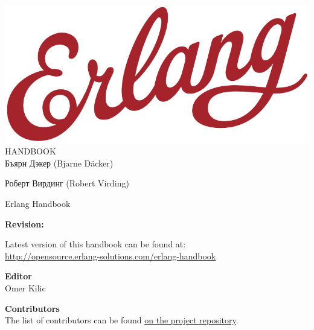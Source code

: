 \documentclass[oneside]{book}
\begin{document}
\begin{titlepage}
\centering

\vspace*{70pt}
\includegraphics[scale=0.3]{includes/erlang-logo.png}\\[0.8\baselineskip]
{\Huge \sffamily HANDBOOK}\\
\vspace{250pt}
{\LARGE \sffamily Бъярн Дэкер (Bjarne D\"acker)}\par
{\LARGE \sffamily Роберт Вирдинг (Robert Virding)}\par

\end{titlepage}


\clearpage
\thispagestyle{empty}
{\Huge Erlang Handbook}\\[0.1\baselineskip]

\vspace{20pt}
{\Large \textbf{Revision:}\\[0.2\baselineskip]
\immediate{}

\immediate{}
}

\vspace{20pt}
{\large Latest version of this handbook can be found at:\\
\url{http://opensource.erlang-solutions.com/erlang-handbook}}

\vfill

\textbf{Editor}\\[0.1\baselineskip]
Omer Kilic

\textbf{Contributors}\\[0.1\baselineskip]
The list of contributors can be found \href{https://github.com/esl/erlang-handbook/graphs/contributors}{on the project repository}.
\end{document}
